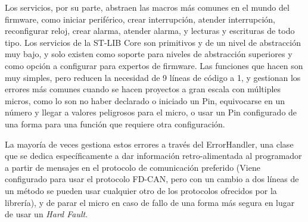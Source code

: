 \documentclass{report}
\begin{document}
Los servicios, por su parte, abstraen las macros más comunes en el mundo del firmware, como iniciar periférico, crear interrupción, atender interrupción, reconfigurar reloj, crear alarma, atender alarma, y lecturas y escrituras de todo tipo. Los servicios de la ST-LIB Core son primitivos y de un nivel de abstracción muy bajo, y solo existen como soporte para niveles de abstracción superiores y como opción a configurar para expertos de firmware. Las funciones que hacen son muy simples, pero reducen la necesidad de 9 líneas de código a 1, y gestionan los errores más comunes cuando se hacen proyectos a gran escala con múltiples micros, como lo son no haber declarado o iniciado un Pin, equivocarse en un número y llegar a valores peligrosos para el micro, o usar un Pin configurado de una forma para una función que requiere otra configuración. \par \vspace{0.3 cm}

La mayoría de veces gestiona estos errores a través del ErrorHandler, una clase que se dedica específicamente a dar información retro-alimentada al programador a partir de mensajes en el protocolo de comunicación preferido (Viene configurado para usar el protocolo FD-CAN, pero con un cambio a dos líneas de un método se pueden usar cualquier otro de los protocolos ofrecidos por la librería), y de parar el micro en caso de fallo de una forma más segura en lugar de usar un \textit{Hard Fault}. 
\end{document}
